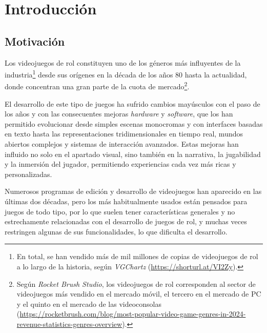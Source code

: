 \chapter{Introducción}
\label{cap:introduccion}


\section{Motivación}
Los videojuegos de rol constituyen uno de los géneros más influyentes de la industria\footnote{En total, se han vendido más de mil millones de copias de videojuegos de rol a lo largo de la historia, según \textit{VGChartz} (\url{https://shorturl.at/VI2Zy}).} desde sus orígenes en la década de los años 80 hasta la actualidad, donde concentran una gran parte de la cuota de mercado\footnote{Según \textit{Rocket Brush Studio}, los videojuegos de rol corresponden al sector de videojuegos más vendido en el mercado móvil, el tercero en el mercado de PC y el quinto en el mercado de las videoconsolas (\url{https://rocketbrush.com/blog/most-popular-video-game-genres-in-2024-revenue-statistics-genres-overview}).}.

\smallskip

El desarrollo de este tipo de juegos ha sufrido cambios mayúsculos con el paso de los años y con las consecuentes mejoras \textit{hardware} y \textit{software}, que los han permitido evolucionar desde simples escenas monocromas y con interfaces basadas en texto hasta las representaciones tridimensionales en tiempo real, mundos abiertos complejos y sistemas de interacción avanzados. Estas mejoras han influido no solo en el apartado visual, sino también en la narrativa, la jugabilidad y la inmersión del jugador, permitiendo experiencias cada vez más ricas y personalizadas.

\medskip

Numerosos programas de edición y desarrollo de videojuegos han aparecido en las últimas dos décadas, pero los más habitualmente usados están pensados para juegos de todo tipo, por lo que suelen tener características generales y no estrechamente relacionadas con el desarrollo de juegos de rol, y muchas veces restringen algunas de sus funcionalidades, lo que dificulta el desarrollo.


